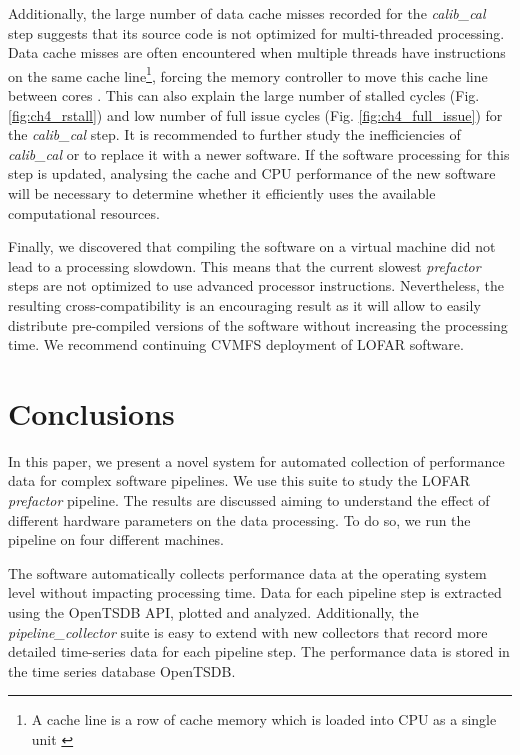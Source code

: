 Additionally, the large number of data cache misses recorded for the \textit{calib\_cal} step suggests that its source code is not optimized for multi-threaded processing. Data cache misses are often encountered when multiple threads have instructions on the same cache line\footnote{A cache line is a row of cache memory which is loaded into CPU as a single unit \citep{cache_architecture} }, forcing the memory controller to move this cache line between cores \citep{cache_misses}. This can also explain the large number of stalled cycles (Fig. \ref{fig:ch4_rstall}) and low number of full issue cycles (Fig. \ref{fig:ch4_full_issue}) for the \textit{calib\_cal} step. It is recommended to further study the inefficiencies of  \textit{calib\_cal} or to replace it with a newer software. If the software processing for this step is updated, analysing the cache and CPU performance of the new software will be necessary to determine whether it efficiently uses the available computational resources. 


Finally, we discovered that compiling the software on a virtual machine did not lead to a processing slowdown. This means that the current slowest \textit{prefactor} steps are not optimized to use advanced processor instructions. Nevertheless, the resulting cross-compatibility is an encouraging result as it will allow to easily distribute pre-compiled versions of the software without increasing the processing time. We recommend continuing CVMFS deployment of LOFAR software. 


\section{Conclusions}
 
In this paper, we present a novel system for automated collection of performance data for complex software pipelines. We use this suite to study the LOFAR \textit{prefactor} pipeline. The results are discussed aiming to understand the effect of different hardware parameters on the data processing. To do so, we run the pipeline on four different machines. 

The software automatically collects performance data at the operating system level without impacting processing time. Data for each pipeline step is extracted using the OpenTSDB API, plotted and analyzed. Additionally, the \textit{pipeline\_collector} suite is easy to extend with new collectors that record more detailed time-series data for each pipeline step. The performance data is stored in the time series database OpenTSDB.

